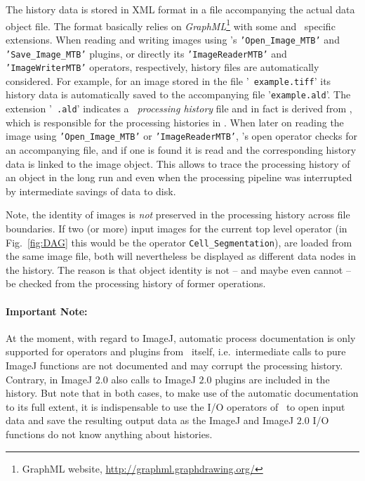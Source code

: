 The history data is stored in XML format in a file accompanying the actual data object file. 
The format basically relies on {\em GraphML}\footnote{GraphML website, 
\href{http://graphml.graphdrawing.org/}{http://graphml.graphdrawing.org/}} with some \alida and \mitobo\
specific extensions. When reading and writing images using \mitobo's {\tt 'Open\_Image\_MTB'} and {\tt 'Save\_Image\_MTB'} plugins,
or directly its {\tt 'ImageReaderMTB'} and {\tt 'ImageWriterMTB'} operators, respectively, history files are automatically considered. For example, for an image stored in the file '{\tt
example.tiff}' its history data is automatically saved to the accompanying file
'{\tt example.ald}'. The extension '{\tt
.ald}' indicates a {\em \mitobo\ processing history} file and in fact is derived from \alida, which is responsible for the 
processing histories in \mitobo. When later on reading the image using {\tt 'Open\_Image\_MTB'} or {\tt 'ImageReaderMTB'},
\mitobo's open operator checks for an accompanying file, and if one is found it is read and the corresponding history data is linked to the
image object. This allows to trace the processing history of an object in the
long run and even when the
processing pipeline was interrupted by intermediate savings of data to disk.

Note, the identity of images is {\em not} preserved in the processing history
across file boundaries. If two (or more) input images for the current top
level operator (in Fig.~\ref{fig:DAG} this would be the operator {\tt Cell\_Segmentation}), are loaded
from the same image file, both will nevertheless be displayed as different data
nodes in the history. The reason is that object identity is not -- and maybe even cannot -- be checked from the
processing history of former operations.

\paragraph{Important Note:}
At the moment, with regard to ImageJ, automatic process documentation is only supported for operators and plugins from
\mitobo\ itself, i.e.~intermediate calls to pure ImageJ functions are not documented and may corrupt the processing history. 
Contrary, in ImageJ $2.0$ also calls to ImageJ $2.0$ plugins are included in the history. But note that in both cases,
to make use of the automatic documentation to its full extent, it is indispensable to use the I/O operators of \mitobo\ to open 
input data and save the resulting output data as the ImageJ and ImageJ $2.0$ I/O functions do not know anything about histories. 
